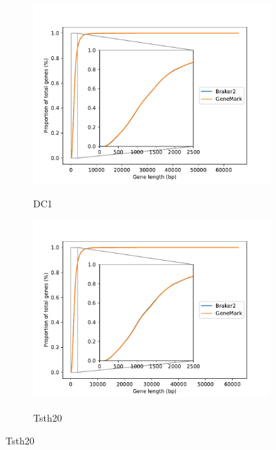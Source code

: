 \begin{figure}
  \centering
    \begin{subfigure}{0.8\textwidth}
      \includegraphics[width=\textwidth]{figures/dc1-gene-cdf.pdf}
      \label{fig:dc1-lengths}
      \caption{DC1}
    \end{subfigure}
    \begin{subfigure}{0.8\textwidth}
      \includegraphics[width=\textwidth]{figures/tsth20-gene-cdf.pdf}
      \label{fig:tsth20-lengths}
      \caption{Tsth20}
    \end{subfigure}
\end{figure}
